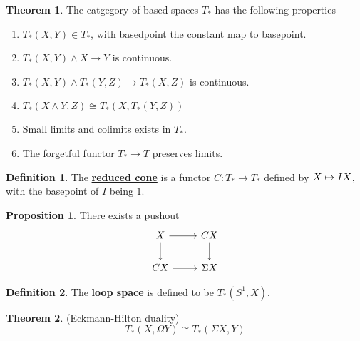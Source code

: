 \documentclass{article}
\theoremstyle{definition}
\newtheorem{theorem}{Theorem}[section]
\theoremstyle{definition}
\newtheorem{definition}{Definition}[theorem]
\theoremstyle{definition}
\theoremstyle{definition}
\newtheorem{proposition}{Proposition}[theorem]
\theoremstyle{definition}
\theoremstyle{definition}
\theoremstyle{definition}
\begin{document}
\begin{tcolorbox}[colback=red!5!white,colframe=red!30!white]
\begin{theorem}
The catgegory of based spaces $T_*$ has the following properties 
\begin{enumerate}
    \item $T_*(X,Y)\in T_*$, with basedpoint the constant map to basepoint.
    \item $T_*(X,Y)\wedge X\to Y$ is continuous.
    \item $T_*(X,Y)\wedge T_*(Y,Z)\to T_*(X,Z)$ is continuous.
    \item $T_*(X\wedge Y,Z)\cong T_*(X,T_*(Y,Z))$
    \item Small limits and colimits exists in $T_*$.
    \item The forgetful functor $T_*\to T$ preserves limits. 
\end{enumerate}
\end{theorem}
\end{tcolorbox}



\begin{tcolorbox}[colback=purple!5!white,colframe=purple!75!black]
\begin{definition}
The \underline{\textbf{reduced cone}} is a functor $C: T_*\to T_*$
defined by $X\mapsto I\smash X$, with the basepoint of $I$ being $1$. 
\end{definition}
\end{tcolorbox}


\begin{tcolorbox}[colback=blue!5!white,colframe=blue!30!white]
\begin{proposition}
There exists a pushout 
\[\begin{tikzcd}
X\arrow[r]\arrow[d]&CX\arrow[d]\\
CX\arrow[r]&\Sigma X
\end{tikzcd}\]
\end{proposition}
\end{tcolorbox}


\begin{tcolorbox}[colback=purple!5!white,colframe=purple!75!black]
\begin{definition}
The \underline{\textbf{loop space}} is defined to be $T_*(S^1,X)$.
\end{definition}
\end{tcolorbox}


\begin{tcolorbox}[colback=red!5!white,colframe=red!30!white]
\begin{theorem}
(Eckmann-Hilton duality) 
\[T_*(X,\Omega Y)\cong T_*(\Sigma X,Y)\] 
\end{theorem}
\end{tcolorbox}
\end{document}
